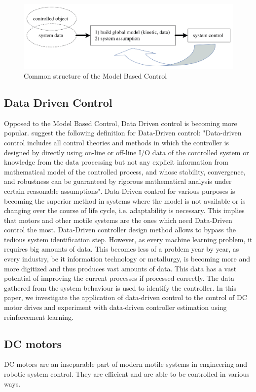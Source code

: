 \documentclass[]{final_report}
\begin{document}
\begin{figure} [h!]
\centerline{\includegraphics[width=.75\textwidth]{Screenshots for paper/1.png}}
\caption{Common structure of the Model Based Control \cite{hou2013model}}
\label{fig:mbcsctruct}
\end{figure}

\subsection{Data Driven Control}

Opposed to the Model Based Control, Data Driven control is becoming more popular. \cite{hou2013model} suggest the following definition for Data-Driven control: "Data-driven control includes all control theories and methods in which the controller is designed by directly using on-line or off-line I/O data of the controlled system or knowledge from the data processing but not any explicit information from mathematical model of the controlled process, and whose stability, convergence, and robustness can be guaranteed by rigorous mathematical analysis under certain reasonable assumptions". Data-Driven control for various purposes is becoming the superior method in systems where the model is not available or is changing over the course of life cycle, i.e. adaptability is necessary. This implies that motors and other motile systems are the ones which need Data-Driven control the most. Data-Driven controller design method allows to bypass the tedious system identification step. However, as every machine learning problem, it requires big amounts of data. This becomes less of a problem year by year, as every industry, be it information technology or metallurgy, is becoming more and more digitized and thus produces vast amounts of data. This data has a vast potential of improving the current processes if processed correctly. The data gathered from the system behaviour is used to identify the controller. In this paper, we investigate the application of data-driven control to the control of DC motor drives and experiment with data-driven controller estimation using reinforcement learning.

\subsection{DC motors}
DC motors are an inseparable part of modern motile systems in engineering and robotic system control. They are efficient and are able to be controlled in various ways. 
\end{document}
